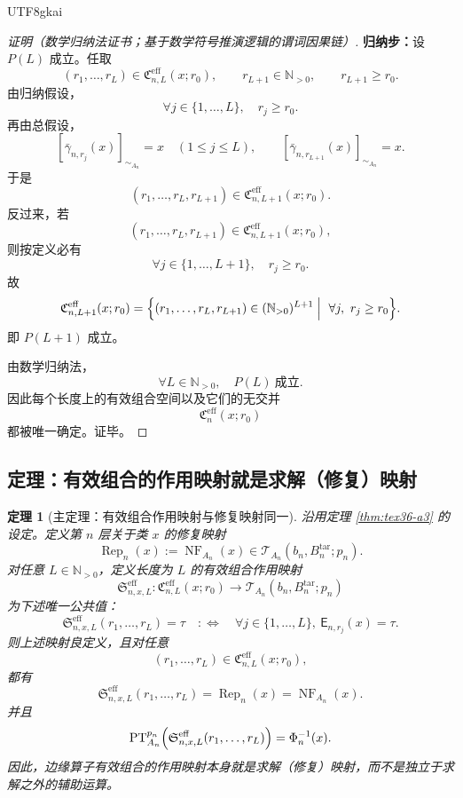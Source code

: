 \documentclass[12pt]{article}
\newtheorem{theorem}{定理}[section]
\newcommand{\NN}{\mathbb{N}}
\newcommand{\PT}{\operatorname{PT}}
\newcommand{\NF}{\operatorname{NF}}
\begin{document}
\begin{CJK*}{UTF8}{gkai}
\begin{proof}[证明（数学归纳法证书；基于数学符号推演逻辑的谓词因果链）]
\textbf{归纳步：}设 $P(L)$ 成立。任取
\[
  (r_1,\ldots,r_L)\in \mathfrak C_{n,L}^{\mathrm{eff}}(x;r_0),
\qquad
  r_{L+1}\in \NN_{>0},
\qquad
  r_{L+1}\ge r_0.
\]
由归纳假设，
\[
  \forall j\in\{1,\ldots,L\},\quad r_j\ge r_0.
\]
再由总假设，
\[
  [\bar{\gamma}_{n,r_j}(x)]_{\sim_{A_n}}=x
  \quad (1\le j\le L),
\qquad
  [\bar{\gamma}_{n,r_{L+1}}(x)]_{\sim_{A_n}}=x.
\]
于是
\[
  (r_1,\ldots,r_L,r_{L+1})
  \in
  \mathfrak C_{n,L+1}^{\mathrm{eff}}(x;r_0).
\]
反过来，若
\[
  (r_1,\ldots,r_L,r_{L+1})
  \in
  \mathfrak C_{n,L+1}^{\mathrm{eff}}(x;r_0),
\]
则按定义必有
\[
  \forall j\in\{1,\ldots,L+1\},\quad r_j\ge r_0.
\]
故
\[
  \mathfrak C_{n,L+1}^{\mathrm{eff}}(x;r_0)
  =
  \Bigl\{
    (r_1,\ldots,r_L,r_{L+1})\in (\NN_{>0})^{L+1}
    \Bigm|\
    \forall j,\ r_j\ge r_0
  \Bigr\}.
\]
即 $P(L+1)$ 成立。

由数学归纳法，
\[
  \forall L\in\NN_{>0},\quad P(L)\ \text{成立}.
\]
因此每个长度上的有效组合空间以及它们的无交并
\[
  \mathfrak C_{n}^{\mathrm{eff}}(x;r_0)
\]
都被唯一确定。证毕。
\end{proof}

\subsection{定理：有效组合的作用映射就是求解（修复）映射}
\label{subsec:tex36-effective-action-is-solve}

\begin{theorem}[主定理：有效组合作用映射与修复映射同一]
\label{thm:tex36-effective-action}
沿用定理 \ref{thm:tex36-a3} 的设定。定义第 $n$ 层关于类 $x$ 的修复映射
\[
  \operatorname{Rep}_n(x):=\NF_{A_n}(x)
  \in \mathcal{T}_{A_n}(b_n,B_n^{\mathrm{tar}};p_n).
\]
对任意 $L\in\NN_{>0}$，定义长度为 $L$ 的有效组合作用映射
\[
  \mathfrak S_{n,x,L}^{\mathrm{eff}}
  :
  \mathfrak C_{n,L}^{\mathrm{eff}}(x;r_0)
  \to
  \mathcal{T}_{A_n}(b_n,B_n^{\mathrm{tar}};p_n)
\]
为下述唯一公共值：
\[
  \mathfrak S_{n,x,L}^{\mathrm{eff}}(r_1,\ldots,r_L)=\tau
  \quad:\Longleftrightarrow\quad
  \forall j\in\{1,\ldots,L\},\ \mathsf E_{n,r_j}(x)=\tau.
\]
则上述映射良定义，且对任意
\[
  (r_1,\ldots,r_L)\in \mathfrak C_{n,L}^{\mathrm{eff}}(x;r_0),
\]
都有
\[
  \mathfrak S_{n,x,L}^{\mathrm{eff}}(r_1,\ldots,r_L)
  =
  \operatorname{Rep}_n(x)
  =
  \NF_{A_n}(x).
\]
并且
\[
  \PT_{A_n}^{p_n}\Bigl(
    \mathfrak S_{n,x,L}^{\mathrm{eff}}(r_1,\ldots,r_L)
  \Bigr)
  =
  \Phi_n^{-1}(x).
\]
因此，边缘算子有效组合的作用映射本身就是求解（修复）映射，而不是独立于求解之外的辅助运算。
\end{theorem}


\end{CJK*}
\end{document}
